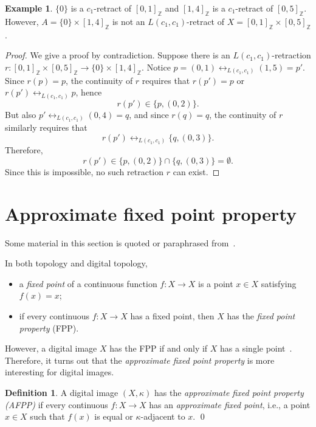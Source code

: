 \documentclass{article}
\theoremstyle{plain}
\theoremstyle{definition}
\newtheorem{definition}[thm]{Definition}
\newtheorem{exl}[thm]{Example}
\numberwithin{thm}{section}
\newcommand{\adj}{\leftrightarrow}
\def\Z{{\mathbb Z}}
\begin{document}
\begin{exl}
$\{0\}$ is a $c_1$-retract of
$[0,1]_{\Z}$ and $[1,4]_{\Z}$ is
a $c_1$-retract of $[0,5]_{\Z}$.
However, $A=\{0\} \times [1,4]_{\Z}$ is
not an $L(c_1,c_1)$-retract of
$X=[0,1]_{\Z} \times [0,5]_{\Z}$.
\end{exl}

\begin{proof} We give a proof by contradiction.
Suppose there is an $L(c_1,c_1)$-retraction $r:
[0,1]_{\Z} \times [0,5]_{\Z} \to
\{0\} \times [1,4]_{\Z}$. Notice
$p=(0,1) \adj_{L(c_1,c_1)} (1,5)=p'$.
Since $r(p)=p$, the continuity of $r$
requires that $r(p')=p$ or $r(p') \adj_{L(c_1,c_1)} p$, hence
\[ r(p') \in \{p,(0,2)\}.
\]
But also
$p' \adj_{L(c_1,c_1)} (0,4)=q$, and since $r(q)=q$, the continuity of $r$
similarly requires that
\[ r(p') \adj_{L(c_1,c_1)} \{q,(0,3)\}.
\]
Therefore,
\[ r(p') \in \{p,(0,2)\} \cap \{q,(0,3)\} = \emptyset.\]
Since this is impossible, no such
retraction $r$ can exist.
\end{proof}

\section{Approximate fixed point property}
Some material in this section is quoted or
paraphrased from~\cite{Boxer16a,BEKLL}.

In both topology and digital topology,
\begin{itemize}
\item a {\em fixed point} of a continuous function
      $f: X \to X$ is a point $x \in X$ satisfying $f(x)=x$;
\item if every continuous $f: X \to X$ has a fixed point,
      then $X$ has the {\em fixed point property} (FPP).
\end{itemize}
However, a digital image $X$ has the FPP if and only
if $X$ has a single point~\cite{BEKLL}. Therefore, it
turns out that the {\em approximate fixed point property} is
more interesting for digital images.

\begin{definition}
\rm{\cite{BEKLL}}
\label{approxFP}
A digital image $(X,\kappa)$ has the
{\em approximate fixed point property (AFPP)} if every
continuous $f: X \to X$ has an {\em approximate fixed point},
i.e., a point $x \in X$ such that $f(x)$ is equal or
$\kappa$-adjacent to $x$. \qed
\end{definition}
\end{document}
